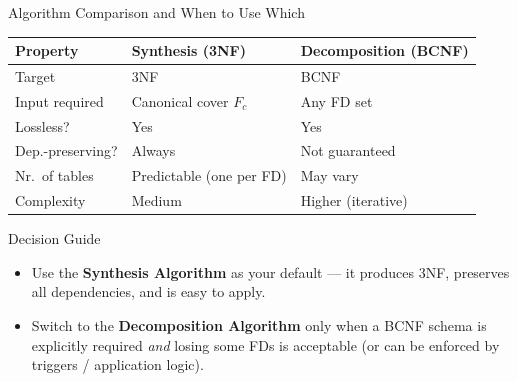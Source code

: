 \begin{frame}{Algorithm Comparison and When to Use Which}
  \begin{center}
    \small
    \begin{tabular}{lll}
      \toprule
      \textbf{Property} & \textbf{Synthesis (3NF)} & \textbf{Decomposition (BCNF)} \\
      \midrule
      Target            & 3NF                       & BCNF \\
      Input required    & Canonical cover $F_c$     & Any FD set \\
      Lossless?         & Yes                       & Yes \\
      Dep.-preserving?  & Always                    & Not guaranteed \\
      Nr.\ of tables    & Predictable (one per FD)  & May vary \\
      Complexity        & Medium                    & Higher (iterative) \\
      \bottomrule
    \end{tabular}
  \end{center}

  \vspace{0.4em}
  \begin{block}{Decision Guide}
    \begin{itemize}
      \item Use the \textbf{Synthesis Algorithm} as your default --- it produces
            3NF, preserves all dependencies, and is easy to apply.
      \item Switch to the \textbf{Decomposition Algorithm} only when a BCNF
            schema is explicitly required \emph{and} losing some FDs is
            acceptable (or can be enforced by triggers / application logic).
    \end{itemize}
  \end{block}
\end{frame}
